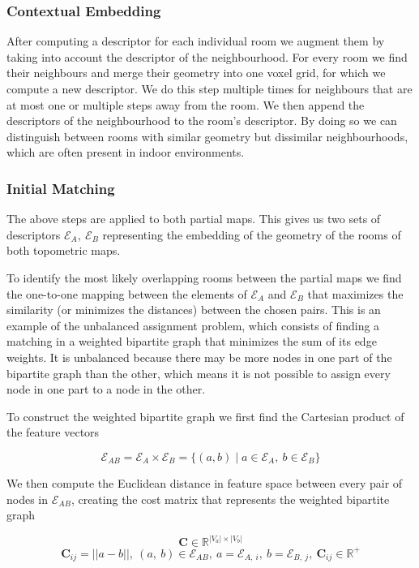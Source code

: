 \subsubsection{Contextual Embedding}
After computing a descriptor for each individual room we augment them by taking into account the descriptor of the neighbourhood. For every room we find their neighbours and merge their geometry into one voxel grid, for which we compute a new descriptor. We do this step multiple times for neighbours that are at most one or multiple steps away from the room. We then append the descriptors of the neighbourhood to the room's descriptor. By doing so we can distinguish between rooms with similar geometry but dissimilar neighbourhoods, which are often present in indoor environments.

\subsubsection{Initial Matching}
The above steps are applied to both partial maps. This gives us two sets of descriptors \(\mathcal{E}_A,\ \mathcal{E}_B\) representing the embedding of the geometry of the rooms of both topometric maps.

To identify the most likely overlapping rooms between the partial maps we find the one-to-one mapping between the elements of \(\mathcal{E}_A\) and \(\mathcal{E}_B\) that maximizes the similarity (or minimizes the distances) between the chosen pairs. This is an example of the unbalanced assignment problem, which consists of finding a matching in a weighted bipartite graph that minimizes the sum of its edge weights. It is unbalanced because there may be more nodes in one part of the bipartite graph than the other, which means it is not possible to assign every node in one part to a node in the other. 

To construct the weighted bipartite graph we first find the Cartesian product of the feature vectors 

\begin{equation}
    \label{eq:E_ab}
    \mathcal{E}_{AB} = \mathcal{E}_A \times \mathcal{E}_B = \{(a,b) \mid a \in \mathcal{E}_A,\ b \in \mathcal{E}_B\}
\end{equation}

We then compute the Euclidean distance in feature space between every pair of nodes in \(\mathcal{E}_{AB}\), creating the cost matrix that represents the weighted bipartite graph 

\begin{equation}
    \label{eq:C}
    \mathbf{C} \in \mathbb{R}^{|V_a| \times |V_b|}
\end{equation}
\begin{equation}
    \label{eq:C}
    \mathbf{C}_{ij} = ||a - b||,\ (a,\ b) \in \mathcal{E}_{AB},\ a = \mathcal{E}_{A,\ i},\ b = \mathcal{E}_{B,\ j},\ \mathbf{C}_{ij} \in \mathbb{R}^+
\end{equation}


